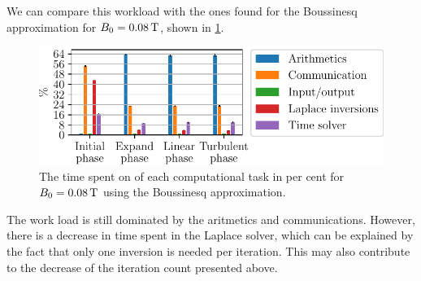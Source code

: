We can compare this workload with the ones found for the Boussinesq approximation for $B_0=0.08\, \text{T}$, shown in \cref{fig:BoussPct}.
%
\begin{figure}[htb]
    \centering
    \includegraphics{fig/results/performance/PercentagesBousScanB00_08}
    \caption{The time spent on of each computational task in per cent for $B_0=0.08\, \text{T}$ using the Boussinesq approximation.}
    \label{fig:BoussPct}
\end{figure}
%
The work load is still dominated by the aritmetics and communications.
However, there is a decrease in time spent in the Laplace solver, which can be explained by the fact that only one inversion is needed per iteration.
This may also contribute to the decrease of the iteration count presented above.
